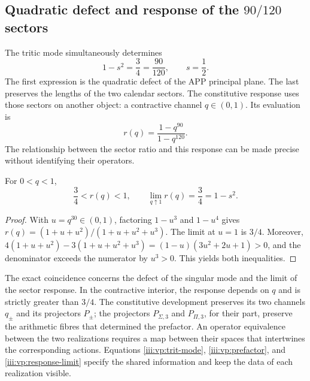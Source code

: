 \clearpage
\subsection{Quadratic defect and response of the \(90/120\) sectors}

The tritic mode simultaneously determines
\begin{equation}
 1-s^2=\frac34=\frac{90}{120},\qquad s=\frac12.
 \label{iii:vp:defect-ratio}
\end{equation}
The first expression is the quadratic defect of the APP principal plane.
The last preserves the lengths of the two calendar sectors.
The constitutive response uses those sectors on another object: a
contractive channel $q\in(0,1)$. Its evaluation is
\[
 r(q)=\frac{1-q^{90}}{1-q^{120}}.
\]
The relationship between the sector ratio and this response can be
made precise without identifying their operators.

\begin{proposition}
For $0<q<1$,
\begin{equation}
 \frac34<r(q)<1,\qquad
 \lim_{q\uparrow1}r(q)=\frac34=1-s^2.
 \label{iii:vp:response-limit}
\end{equation}
\end{proposition}
\begin{proof}
With $u=q^{30}\in(0,1)$, factoring $1-u^3$ and
$1-u^4$ gives
$r(q)=(1+u+u^2)/(1+u+u^2+u^3)$. The limit at $u=1$ is
$3/4$. Moreover,
$4(1+u+u^2)-3(1+u+u^2+u^3)
=(1-u)(3u^2+2u+1)>0$, and the denominator exceeds the numerator
by $u^3>0$. This yields both inequalities.
\end{proof}

The exact coincidence concerns the defect of the singular mode and the limit
of the sector response. In the contractive interior, the response
depends on $q$ and is strictly greater than $3/4$. The constitutive
development preserves its two channels $q_\pm$ and its projectors
$P_\pm$; the projectors $P_{\Sigma,3}$ and $P_{\Pi,3}$, for their
part, preserve the arithmetic fibres that determined the prefactor.
An operator equivalence between the two realizations requires a map
between their spaces that intertwines the corresponding actions.
Equations \eqref{iii:vp:trit-mode}, \eqref{iii:vp:prefactor}, and
\eqref{iii:vp:response-limit} specify the shared information and
keep the data of each realization visible.
